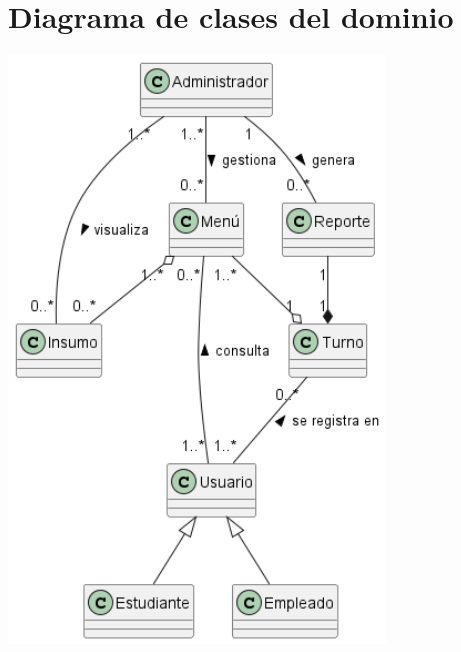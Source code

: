 \documentclass[12pt]{article}
\begin{document}
    \section{Diagrama de clases del dominio}
        \begin{center}
            \vfill
            \includegraphics[width=10cm]{Partes/ModeloDominio.png}
            \vfill
        \end{center}
\end{document}
